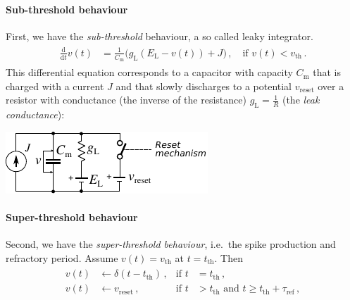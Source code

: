 \documentclass[10pt,letterpaper,oneside]{article}
\begin{document}
\paragraph{Sub-threshold behaviour}
First, we have the \emph{sub-threshold} behaviour, a so called leaky integrator.
\begin{align}
	\begin{aligned}
		\frac{\mathrm{d}}{\mathrm{d}t} v(t) &= \frac{1}{C_\mathrm{m}} \big(g_\mathrm{L} (E_\mathrm{L} - v(t))
			+ J
		\big) \,, \quad \text{if } v(t) < v_\mathrm{th}\,.
	\end{aligned}
	\label{eqn:sub-threshold}
\end{align}
This differential equation corresponds to a capacitor with capacity $C_\mathrm{m}$ that is charged with a current $J$ and that slowly discharges to a potential $v_\mathrm{reset}$ over a resistor with conductance (the inverse of the resistance) $g_\mathrm{L} = \frac{1}{R}$ (the \emph{leak conductance}):
\begin{center}
	\hspace{2.5cm}\includegraphics[scale=1.5]{media/lif_circuit.pdf}
\end{center}

\paragraph{Super-threshold behaviour}
Second, we have the \emph{super-threshold behaviour}, i.e.~the spike production and refractory period. Assume $v(t) = v_\mathrm{th}$ at $t = t_\mathrm{th}$. Then
\begin{align}
	\begin{aligned}
		v(t) &\gets \delta(t - t_\mathrm{th}) \,, &\text{if } t &= t_\mathrm{th} \,,\\
		v(t) &\gets v_\mathrm{reset} \,, &\text{if } t &> t_\mathrm{th} \text{ and } t \geq t_\mathrm{th} + \tau_\mathrm{ref} \,,
	\end{aligned}
	\label{eqn:super-threshold}
\end{align}

\end{document}
